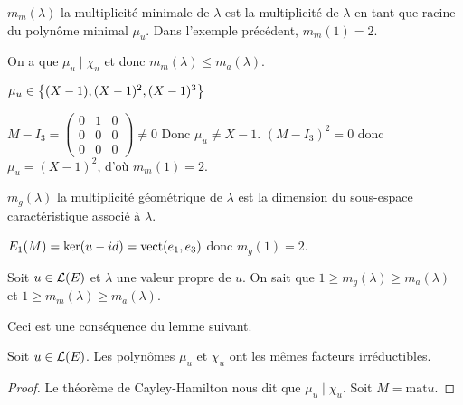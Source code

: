 $m_m(\lambda)$ la multiplicité minimale de $\lambda$ est la multiplicité de $\lambda$ en tant que racine du polynôme minimal $\mu_u$.
Dans l'exemple précédent, $m_m(1) = 2$.

On a que $\mu_u \mid \chi_u$ et donc $m_m(\lambda) \leq m_a(\lambda)$.

$\mu_u \in  \left\{(X-1), (X-1)^2, (X-1)^3\right\}$

$M - I_3 = \begin{pmatrix}
		0 & 1 & 0 \\ 0 & 0 & 0 \\ 0 & 0 & 0
	\end{pmatrix} \neq 0$ Donc $\mu_u \neq X - 1$.
$(M - I_3)^2 = 0$ donc $\mu_u = (X-1)^2$, d'où $m_m(1) = 2$.


$m_g(\lambda)$ la multiplicité géométrique de $\lambda$ est la dimension du sous-espace caractéristique associé à $\lambda$.

$E_1 (M) = \ker (u-id) = \text{vect} (e_1, e_3)$ donc $m_g(1) = 2$.


\begin{prop}
	Soit $u \in \mathcal{L}(E)$ et $\lambda$ une valeur propre de $u$. On sait que $ 1 \geq m_g(\lambda) \geq m_a(\lambda)$ et $1 \geq m_m(\lambda) \geq m_a(\lambda)$.

	Ceci est une conséquence du lemme suivant.
\end{prop}

\begin{lemma}
	Soit $u \in \mathcal{L}(E)$. Les polynômes $\mu_u$ et $\chi_u$ ont les mêmes facteurs irréductibles.
\end{lemma}

\begin{proof}
	Le théorème de Cayley-Hamilton nous dit que $\mu_u \mid \chi_u$. Soit $M = \text {mat} u$.
\end{proof}








